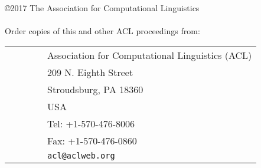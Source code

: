\documentclass[11pt]{article}
\begin{document}
\noindent \\%
{\em \\%
\\%
}%

%
%

\vspace*{3.5in}
\large
\noindent
\copyright 2017 The Association for Computational Linguistics\\
\hspace*{6.5mm} \\

\vspace*{0.6in}
\noindent Order copies of this and other ACL proceedings from: \\
\vspace*{3mm}

\begin{tabular}{ll}
\ \ \ \ \ \ & Association for Computational Linguistics (ACL) \\
& 209 N. Eighth Street \\
& Stroudsburg, PA 18360 \\
& USA \\
& Tel: +1-570-476-8006 \\
& Fax: +1-570-476-0860 \\
& {\tt acl@aclweb.org} \\
\end{tabular}

\vspace*{6mm}
\noindent \\%
\noindent \\%
\end{document}
